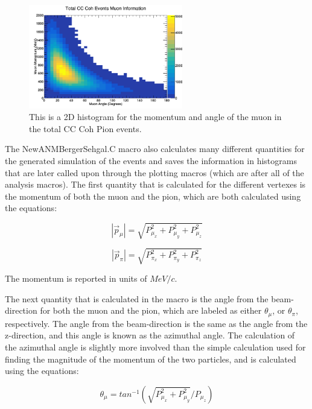 \documentclass[11pt]{article}
\begin{document}
\begin{figure}[H]
\centering
\includegraphics[width=0.6\textwidth]{NewANMBergerSehgalImages/9-TotalCCCohMuonInfoANMBS.png}
\caption{This is a 2D histogram for the momentum and angle of the muon in the total CC Coh Pion events.}
\end{figure}

The NewANMBergerSehgal.C macro also calculates many different quantities for the generated simulation of the events and saves the information in histograms that are later called upon through the plotting macros (which are after all of the analysis macros). The first quantity that is calculated for the different vertexes is the momentum of both the muon and the pion, which are both calculated using the equations:

\begin{equation}
|\vec{p}_\mu| = \sqrt{P_{\mu_x}^2 + P_{\mu_y}^2 + P_{\mu_z}^2}
\end{equation}

\begin{equation}
|\vec{p}_\pi| = \sqrt{P_{\pi_x}^2 + P_{\pi_y}^2 + P_{\pi_z}^2}
\end{equation}

\noindent
The momentum is reported in units of $MeV/c$.

The next quantity that is calculated in the macro is the angle from the beam-direction for both the muon and the pion, which are labeled as either $\theta_\mu$, or $\theta_\pi$, respectively. The angle from the beam-direction is the same as the angle from the z-direction, and this angle is known as the azimuthal angle. The calculation of the azimuthal angle is slightly more involved than the simple calculation used for finding the magnitude of the momentum of the two particles, and is calculated using the equations:

\begin{equation}
\theta_\mu = tan^{-1}(\sqrt{P_{\mu_x}^2 + P_{\mu_y}^2}/{P_{\mu_z}})
\end{equation}
\end{document}
